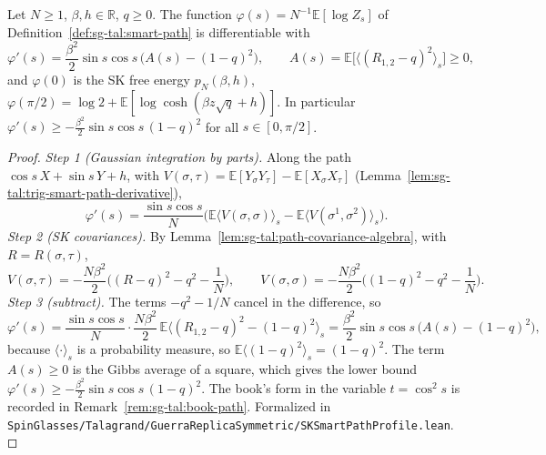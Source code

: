\begin{theorem}\label{thm:sg-tal:smart-path-deriv}
  \leanok
{}
Let $N\ge1$, $\beta,h\in\mathbb R$, $q\ge0$. The function $\varphi(s) = N^{-1}\mathbb{E}[\log Z_s]$ of Definition~\ref{def:sg-tal:smart-path} is differentiable with
\[
\varphi'(s) = \frac{\beta^2}{2}\sin s\cos s\,\Big(A(s) - (1 - q)^2\Big),\qquad A(s)=\mathbb{E}\big[\langle (R_{1,2} - q)^2 \rangle_s\big]\ge0,
\]
and $\varphi(0)$ is the SK free energy $p_N(\beta,h)$, $\varphi(\pi/2)=\log 2+\mathbb{E}[\log\cosh(\beta z\sqrt q+h)]$. In particular $\varphi'(s) \ge -\frac{\beta^2}{2}\sin s\cos s\,(1 - q)^2$ for all $s \in [0, \pi/2]$.
\end{theorem}
\begin{proof}
  \leanok
\emph{Step 1 (Gaussian integration by parts).} Along the path $\cos s\,X+\sin s\,Y+h$, with $V(\sigma,\tau)=\mathbb{E}[Y_\sigma Y_\tau]-\mathbb{E}[X_\sigma X_\tau]$ (Lemma~\ref{lem:sg-tal:trig-smart-path-derivative}),
\[
\varphi'(s)=\frac{\sin s\cos s}N\Big(\mathbb{E}\langle V(\sigma,\sigma)\rangle_s-\mathbb{E}\langle V(\sigma^1,\sigma^2)\rangle_s\Big).
\]
\emph{Step 2 (SK covariances).} By Lemma~\ref{lem:sg-tal:path-covariance-algebra}, with $R=R(\sigma,\tau)$,
\[
V(\sigma,\tau)=-\frac{N\beta^2}2\Big((R-q)^2-q^2-\frac1N\Big),\qquad V(\sigma,\sigma)=-\frac{N\beta^2}2\Big((1-q)^2-q^2-\frac1N\Big).
\]
\emph{Step 3 (subtract).} The terms $-q^2-1/N$ cancel in the difference, so
\[
\varphi'(s)=\frac{\sin s\cos s}N\cdot\frac{N\beta^2}2\,\mathbb{E}\Big\langle(R_{1,2}-q)^2-(1-q)^2\Big\rangle_s=\frac{\beta^2}2\sin s\cos s\,\big(A(s)-(1-q)^2\big),
\]
because $\langle\cdot\rangle_s$ is a probability measure, so $\mathbb{E}\langle(1-q)^2\rangle_s=(1-q)^2$. The term $A(s)\ge0$ is the Gibbs average of a square, which gives the lower bound $\varphi'(s)\ge-\frac{\beta^2}2\sin s\cos s\,(1-q)^2$. The book's form in the variable $t=\cos^2s$ is recorded in Remark~\ref{rem:sg-tal:book-path}.
Formalized in \texttt{SpinGlasses/Talagrand/GuerraReplicaSymmetric/SKSmartPathProfile.lean}.
\end{proof}

